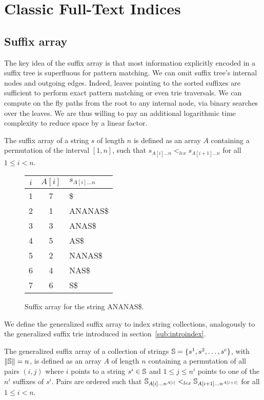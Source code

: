 \section{Classic Full-Text Indices}

\subsection{Suffix array}

The key idea of the suffix array \citep{Manber1990} is that most information explicitly encoded in a suffix tree is superfluous for pattern matching.
We can omit suffix tree's internal nodes and outgoing edges.
Indeed, leaves pointing to the sorted suffixes are sufficient to perform exact pattern matching or even trie traversals.
We can compute on the fly paths from the root to any internal node, via binary searches over the leaves.
We are thus willing to pay an additional logarithmic time complexity to reduce space by a linear factor.

\begin{definition}
The suffix array of a string $s$ of length $n$ is defined as an array $A$ containing a permutation of the interval $[1,n]$, such that $s_{A[i] \dots n} <_{lex} s_{A[i+1] \dots n}$ for all $1 \leq i < n$.
\end{definition}

\begin{figure}[h]
\begin{center}
\caption{Suffix array for the string {\ttfamily ANANAS\$}.}
\label{fig:sa}
\small
\ttfamily
\begin{tabular}{ccl}
$i$ & $A[i]$ & $s_{A[i]\dots n}$\\
\midrule
1 & 7 & \$\\
2 & 1 & ANANAS\$\\
3 & 3 & ANAS\$\\
4 & 5 & AS\$\\
5 & 2 & NANAS\$\\
6 & 4 & NAS\$\\
7 & 6 & S\$\\
\end{tabular}
\end{center}
\end{figure}

We define the generalized suffix array to index string collections, analogously to the generalized suffix trie introduced in section~\ref{sub:introindex}.
\begin{definition}
The generalized suffix array of a collection of strings $\mathbb {S} = \{ s^1, s^2, \dots, s^c \}$, with $\left\lVert\mathbb {S}\right\rVert=n$, is defined as an array $A$ of length $n$ containing a permutation of all pairs $(i,j)$ where $i$ points to a string $s^i \in \mathbb {S}$ and $1 \leq j \leq n^i$ points to one of the $n^i$ suffixes of $s^i$.
Pairs are ordered such that $\mathbb {S}_{A[i] \dots n^{A[i]}} <_{lex} \mathbb {S}_{A[i+1] \dots n^{A[i+1]}}$ for all $1 \leq i < n$.
\end{definition}

